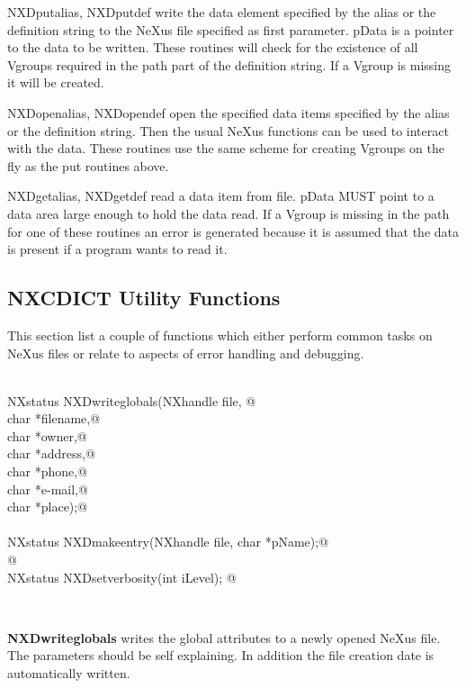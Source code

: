 \documentclass[12pt]{article}
\begin{document}
 NXDputalias, NXDputdef write the data element specified by the alias or
 the definition string to the NeXus file specified as first parameter. 
 pData is a pointer to the data to be written. These routines will check for
 the existence of all Vgroups required in the path part of the definition
 string. If a Vgroup  is missing it will be created. 

 NXDopenalias, NXDopendef open the specified data items specified by the
 alias or the definition string. Then the usual NeXus functions can be 
 used to interact with the data. These routines use the same scheme for
 creating Vgroups on the fly as the put routines above.

 NXDgetalias, NXDgetdef read a data item from file. pData MUST point to a
 data area large enough to hold the data read. If a Vgroup is missing in
 the path for one of these routines an error is generated because it is 
 assumed that the data is present if a program wants to read it.  
  
  \subsection{NXCDICT Utility Functions}
  This section list a couple of functions which either perform common 
   tasks on NeXus files or relate
  to aspects of error handling and debugging.

\begin{flushleft} \small
\begin{minipage}{\linewidth} \label{scrap4}
\vspace{-1ex}
\begin{list}{}{} \item
\mbox{}\verb@@\\
\mbox{}\verb@   NXstatus NXDwriteglobals(NXhandle file, @\\
\mbox{}\verb@                            char *filename,@\\
\mbox{}\verb@                            char *owner,@\\
\mbox{}\verb@                            char *address,@\\
\mbox{}\verb@                            char *phone,@\\
\mbox{}\verb@                            char *e-mail,@\\
\mbox{}\verb@                            char *place);@\\
\mbox{}\verb@@\\
\mbox{}\verb@   NXstatus NXDmakeentry(NXhandle file, char *pName);@\\
\mbox{}\verb@                            @\\
\mbox{}\verb@   NXstatus NXDsetverbosity(int iLevel);   @\\
\end{list}
\vspace{-1ex}
\footnotesize\addtolength{\baselineskip}{-1ex}
\end{minipage}\\[4ex]
\end{flushleft}
{\bf NXDwriteglobals} writes the global attributes to a newly opened 
 NeXus file. The parameters should be self explaining. In addition 
 the file creation date is automatically written.
\end{document}
